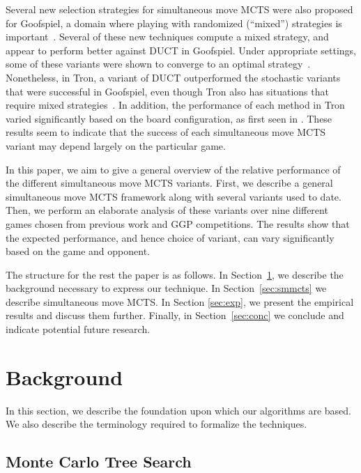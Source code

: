 \documentclass[conference]{IEEEtran}
\begin{document}
Several new selection strategies for simultaneous move MCTS were also proposed for Goofspiel, 
a domain where playing with randomized (``mixed'') strategies is important~\cite{Lanctot13Goofspiel}.
Several of these new techniques compute a mixed strategy, and appear to perform better against DUCT in Goofspiel. 
Under appropriate settings, some of these variants were shown to converge to an optimal strategy~\cite{Lisy13Computing}. 
Nonetheless, in Tron, a variant of DUCT outperformed the stochastic variants that were successful in Goofspiel, even though Tron 
also has situations that require mixed strategies~\cite{Lanctot13Tron}. 
In addition, the performance of each method in Tron varied significantly based on the board configuration, as first seen 
in \cite{DenTeuling12Tron}.
These results seem to indicate that the success of each simultaneous move MCTS variant may depend largely on the particular game. 

In this paper, we aim to give a general overview of the relative performance of the different simultaneous move MCTS variants. 
First, we describe a general simultaneous move MCTS framework along with several variants used to date. Then, we perform an 
elaborate analysis of these variants over nine different games chosen from previous work and GGP competitions. 
The results show that the expected performance, and hence choice of variant, can vary significantly based on the game and opponent. 

The structure for the rest the paper is as follows. In Section~\ref{sec:background}, we describe the background necessary to 
express our technique. In Section~\ref{sec:smmcts} we describe simultaneous move MCTS. In Section \ref{sec:exp}, we present 
the empirical results and discuss them further. Finally, in Section~\ref{sec:conc} we conclude and indicate potential future research.

\section{Background}
\label{sec:background}

In this section, we describe the foundation upon which our algorithms are based. 
We also describe the terminology required to formalize the techniques. 

\subsection{Monte Carlo Tree Search}
\end{document}
